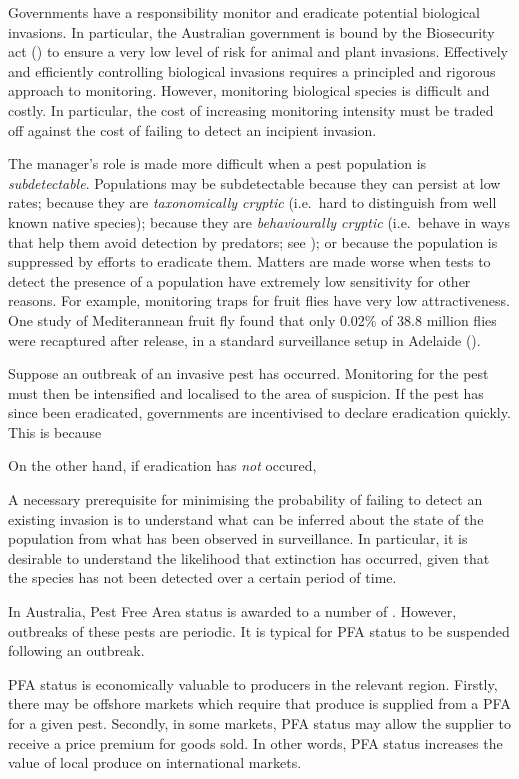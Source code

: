 \documentclass[
]{book}
\begin{document}
Governments have a responsibility monitor and eradicate potential biological invasions. In particular, the Australian government is bound by the Biosecurity act () to ensure a very low level of risk for animal and plant invasions. Effectively and efficiently controlling biological invasions requires a principled and rigorous approach to monitoring. However, monitoring biological species is difficult and costly. In particular, the cost of increasing monitoring intensity must be traded off against the cost of failing to detect an incipient invasion.

The manager's role is made more difficult when a pest population is \emph{subdetectable}. Populations may be subdetectable because they can persist at low rates; because they are \emph{taxonomically cryptic} (i.e.~hard to distinguish from well known native species); because they are \emph{behaviourally cryptic} (i.e.~behave in ways that help them avoid detection by predators; see \citet{kery2002}); or because the population is suppressed by efforts to eradicate them. Matters are made worse when tests to detect the presence of a population have extremely low sensitivity for other reasons. For example, monitoring traps for fruit flies have very low attractiveness. One study of Mediterannean fruit fly found that only 0.02\% of 38.8 million flies were recaptured after release, in a standard surveillance setup in Adelaide (\citet{ms2007}).

Suppose an outbreak of an invasive pest has occurred. Monitoring for the pest must then be intensified and localised to the area of suspicion. If the pest has since been eradicated, governments are incentivised to declare eradication quickly. This is because

On the other hand, if eradication has \emph{not} occured,

A necessary prerequisite for minimising the probability of failing to detect an existing invasion is to understand what can be inferred about the state of the population from what has been observed in surveillance. In particular, it is desirable to understand the likelihood that extinction has occurred, given that the species has not been detected over a certain period of time.

In Australia, Pest Free Area status is awarded to a number of . However, outbreaks of these pests are periodic. It is typical for PFA status to be suspended following an outbreak.

PFA status is economically valuable to producers in the relevant region. Firstly, there may be offshore markets which require that produce is supplied from a PFA for a given pest. Secondly, in some markets, PFA status may allow the supplier to receive a price premium for goods sold. In other words, PFA status increases the value of local produce on international markets.
\end{document}
